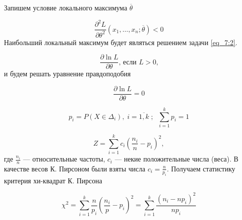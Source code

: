 \documentclass[12pt]{article}
\begin{document}
Запишем условие локального максимума $\overline{\theta}$

\begin{equation}
	\frac{\partial^2 L}{\partial \theta^2} (x_1, \ldots, x_n; \overline{\theta}) 
	< 0
	\label{eq_7:4}
\end{equation}
Наибольший локальный максимум будет являться решением задачи \eqref{eq_7:2}. 


\begin{equation}
	\frac{\partial \ln L}{\partial \theta} \text{, если $L > 0$,}
	\label{eq_7:5}
\end{equation}
и будем решать уравнение правдоподобия

\begin{equation}
    \frac{\partial \ln  L}{\partial \theta} = 0
    \label{eq_7:6}
\end{equation}


\begin{equation}
    p_i = P(X \in \Delta_i), \; i = \overline{1,k}\;; \;\; \sum_{i=1}^{k} p_i = 1
    \label{cond_7:1}
\end{equation}


\begin{equation}
    Z = \sum_{i=1}^{k}c_i \left(\frac{n_i}{n} - p_i\right)^2,
    \label{eq_7:7}
\end{equation}
где $\frac{n_i}{n}$ –– относительные частоты, $c_i$ –– некие положительные числа (веса). В качестве весов К. Пирсоном были взяты числа $c_i = \frac{n}{p_i}$. Получаем статистику критерия хи-квадрат К. Пирсона

\begin{equation}
    \chi^2 = \sum_{i=1}^{k}\frac{n}{p_i} \left(\frac{n_i}{p} - p_i\right)^2 = \sum_{i=1}^{k}\frac{(n_i - np_i)^2}{np_i}
    \label{eq_7:8}
\end{equation}
\end{document}
